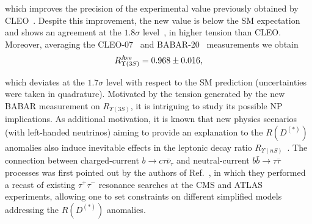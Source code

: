 \documentclass[reprint,showpacs,aps,prd,nofootinbib,superscriptaddress,longbibliography]{revtex4-1}
\begin{document}
\noindent which improves the precision of the experimental value previously obtained by CLEO~\cite{Besson:2006gj}. Despite this improvement, the new value is below the SM expectation and shows an agreement at the $1.8\sigma$ level~\cite{Lees:2020kom}, in higher tension than CLEO. Moreover, averaging the CLEO-07~\cite{Besson:2006gj} and BABAR-20~\cite{Lees:2020kom} measurements we obtain 
 \begin{equation}
R_{\Upsilon(3S)}^{\rm Ave} = 0.968 \pm 0.016,
\end{equation}

\noindent which deviates at the $1.7\sigma$ level with respect to the SM prediction (uncertainties were taken in quadrature). Motivated by the tension generated by the new BABAR measurement on $R_{\Upsilon(3S)}$, it is intriguing to study its possible NP implications. As additional motivation, it is known that new physics scenarios (with left-handed neutrinos) aiming to provide an explanation to the $R(D^{(\ast)})$ anomalies also induce inevitable effects in the leptonic decay ratio $R_{\Upsilon(nS)}$~\cite{Aloni:2017eny}.
The connection between charged-current $b \to c \tau \bar{\nu}_{\tau}$ and neutral-current $b  \bar{b} \to \tau \bar{\tau}$ processes was first pointed out by the authors of Ref.~\cite{Faroughy:2016osc}, in which they performed a recast of existing $\tau^+\tau^-$ resonance searches at the CMS and ATLAS experiments, allowing one to set constraints on different simplified models addressing the $R(D^{(\ast)})$ anomalies. 
\end{document}
